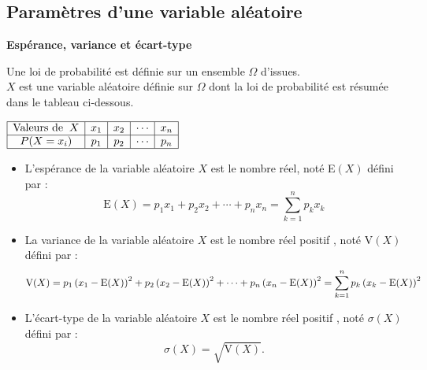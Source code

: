 \subsection{Paramètres d'une variable aléatoire}
\textbf{Espérance, variance et écart-type}
 \begin{definition}
 Une loi de probabilité est définie sur un ensemble $ \Omega $  d'issues.\\ $ X $  est une variable aléatoire  définie sur $ \Omega $ dont la loi de probabilité est résumée dans le tableau ci-dessous.
\bigskip

$\begin{array}{|c|c|c|c|c|}
\hline
\text{Valeurs de} \;\; X & x_{1}& x_{2} &\cdots  &x_{n}\\
\hline
 P(X=x_{i})  &  p_{1} &  p_{2}   &\cdots   &  p_{n} \\
\hline
\end{array}$


\begin{itemize}
\item L'espérance de la variable aléatoire $ X $  est le nombre réel, noté E$ (X) $  défini par :
  \[ \text{E}(X)=p_{1}x_{1} + p_{2}x_{2} +\cdots + p_{n}x_{n} =\displaystyle \sum_{k=1}^n p_{k}x_{k} \]
  
   \item  La variance  de la variable aléatoire $ X $  est le nombre réel  positif , noté V$ (X) $  défini par :
  \[ \text{V}(X)=p_{1}\left(x_{1}-\text{E}(X)\right)^{2} + p_{2}\left(x_{2}-\text{E}(X)\right)^{2} +\cdots + p_{n}\left(x_{n}-\text{E}(X)\right)^{2} =\displaystyle\sum_{k=1}^n p_{k}\left(x_{k}-\text{E}(X)\right)^{2}\]
\item L'écart-type  de la variable aléatoire $ X $  est le nombre réel  positif , noté $ \sigma(X) $  défini par :$$ \sigma(X)=\sqrt{\text{V}(X)}.$$
 \end{itemize}
\end{definition}

